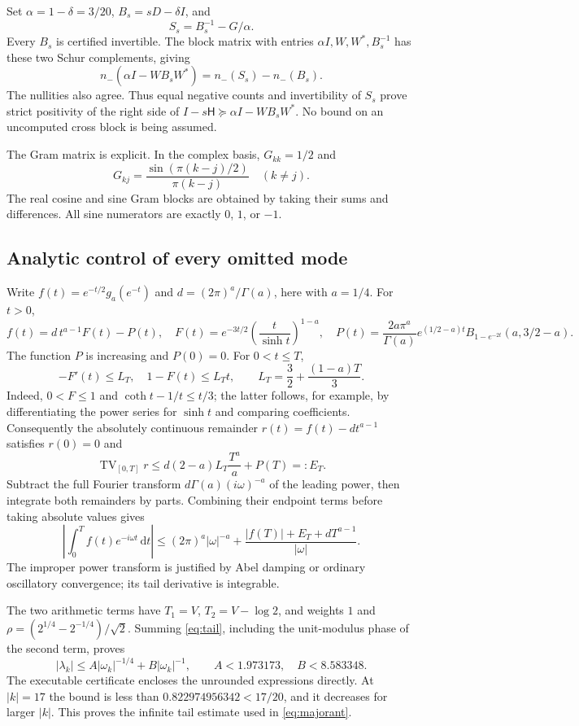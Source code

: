 \documentclass[11pt,letterpaper]{article}
\newcommand{\dd}{\mathrm d}
\begin{document}
Set $\alpha=1-\delta=3/20$, $B_s=sD-\delta I$, and
\begin{equation}\label{eq:inertia}
 S_s=B_s^{-1}-G/\alpha.
\end{equation}
Every $B_s$ is certified invertible. The block matrix with entries $\alpha I,W,W^*,B_s^{-1}$ has these two Schur complements, giving
\[
 n_-(\alpha I-WB_sW^*)=n_-(S_s)-n_-(B_s).
\]
The nullities also agree. Thus equal negative counts and invertibility of $S_s$ prove strict positivity of the right side of $I-s\mathsf H\succeq\alpha I-WB_sW^*$. No bound on an uncomputed cross block is being assumed.

The Gram matrix is explicit. In the complex basis, $G_{kk}=1/2$ and
\[
 G_{kj}=\frac{\sin(\pi(k-j)/2)}{\pi(k-j)}\quad(k\ne j).
\]
The real cosine and sine Gram blocks are obtained by taking their sums and differences. All sine numerators are exactly $0$, $1$, or $-1$.

\subsection*{Analytic control of every omitted mode}
Write $f(t)=e^{-t/2}g_a(e^{-t})$ and $d=(2\pi)^a/\Gamma(a)$, here with $a=1/4$. For $t>0$,
\[
 f(t)=d\,t^{a-1}F(t)-P(t),\quad
 F(t)=e^{-3t/2}\left(\frac{t}{\sinh t}\right)^{1-a},\quad
 P(t)=\frac{2a\pi^a}{\Gamma(a)}e^{(1/2-a)t}
 B_{1-e^{-2t}}(a,3/2-a).
\]
The function $P$ is increasing and $P(0)=0$. For $0<t\leq T$,
\[
 -F'(t)\leq L_T,\quad 1-F(t)\leq L_Tt,
 \qquad L_T=\frac32+\frac{(1-a)T}{3}.
\]
Indeed, $0<F\leq1$ and $\coth t-1/t\leq t/3$; the latter follows, for example, by differentiating the power series for $\sinh t$ and comparing coefficients. Consequently the absolutely continuous remainder $r(t)=f(t)-dt^{a-1}$ satisfies $r(0)=0$ and
\[
 \operatorname{TV}_{[0,T]}r\leq d(2-a)L_T\frac{T^a}{a}+P(T)=:E_T.
\]
Subtract the full Fourier transform $d\Gamma(a)(i\omega)^{-a}$ of the leading power, then integrate both remainders by parts. Combining their endpoint terms before taking absolute values gives
\begin{equation}\label{eq:tail}
 \left|\int_0^T f(t)e^{-i\omega t}\,\dd t\right|
 \leq (2\pi)^a|\omega|^{-a}
 +\frac{|f(T)|+E_T+dT^{a-1}}{|\omega|}.
\end{equation}
The improper power transform is justified by Abel damping or ordinary oscillatory convergence; its tail derivative is integrable.

The two arithmetic terms have $T_1=V$, $T_2=V-\log2$, and weights $1$ and $\rho=(2^{1/4}-2^{-1/4})/\sqrt2$. Summing \eqref{eq:tail}, including the unit-modulus phase of the second term, proves
\[
 |\lambda_k|\leq A|\omega_k|^{-1/4}+B|\omega_k|^{-1},\qquad
 A<1.973173,\quad B<8.583348.
\]
The executable certificate encloses the unrounded expressions directly. At $|k|=17$ the bound is less than $0.822974956342<17/20$, and it decreases for larger $|k|$. This proves the infinite tail estimate used in \eqref{eq:majorant}.
\end{document}
